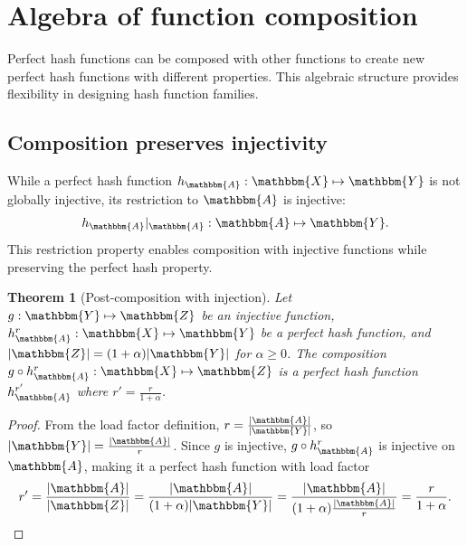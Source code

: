 \documentclass[hidelinks,11pt,final]{article}
\newcommand{\envnumstyle}{section}
\theoremstyle{plain}
\newtheorem{theorem}{Theorem}[\envnumstyle]
\begin{document}

\section{Algebra of function composition}

Perfect hash functions can be composed with other functions to create new perfect hash functions with different properties. This algebraic structure provides flexibility in designing hash function families.

\subsection{Composition preserves injectivity}

While a perfect hash function $h_\mathbbm{A} : \mathbbm{X} \mapsto \mathbbm{Y}$ is not globally injective, its restriction to $\mathbbm{A}$ is injective:
\begin{equation}
	h_\mathbbm{A}|_{\mathbbm{A}} : \mathbbm{A} \mapsto \mathbbm{Y}.
\end{equation}
This restriction property enables composition with injective functions while preserving the perfect hash property.

\begin{theorem}[Post-composition with injection]
Let $g : \mathbbm{Y} \mapsto \mathbbm{Z}$ be an injective function, $h_\mathbbm{A}^r : \mathbbm{X} \mapsto \mathbbm{Y}$ be a perfect hash function, and $|\mathbbm{Z}| = (1 + \alpha) |\mathbbm{Y}|$ for $\alpha \geq 0$.
The composition $g \circ h_\mathbbm{A}^r : \mathbbm{X} \mapsto \mathbbm{Z}$ is a perfect hash function $h_\mathbbm{A}^{r'}$ where $r' = \frac{r}{1+\alpha}$.
\end{theorem}
\begin{proof}
From the load factor definition, $r = \frac{|\mathbbm{A}|}{|\mathbbm{Y}|}$, so $|\mathbbm{Y}| = \frac{|\mathbbm{A}|}{r}$.
Since $g$ is injective, $g \circ h_\mathbbm{A}^r$ is injective on $\mathbbm{A}$, making it a perfect hash function with load factor
\begin{equation}
	r' = \frac{|\mathbbm{A}|}{|\mathbbm{Z}|} = \frac{|\mathbbm{A}|}{(1+\alpha)|\mathbbm{Y}|} = \frac{|\mathbbm{A}|}{(1+\alpha)\frac{|\mathbbm{A}|}{r}} = \frac{r}{1+\alpha}.
\end{equation}
\end{proof}
\end{document}
